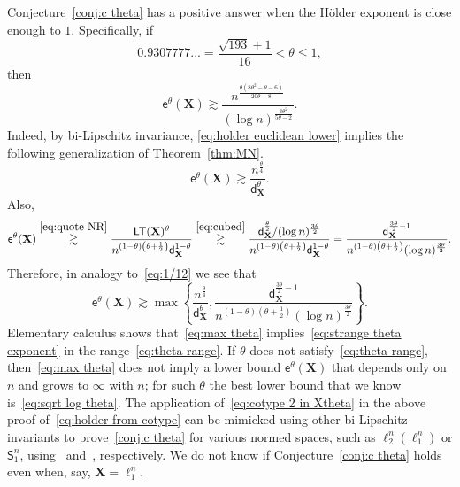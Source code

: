 \documentclass[11pt,reqno]{amsart}
\renewcommand{\le}{\leqslant}
\newcommand{\dd}{\mathsf{d}}
\newcommand{\X}{\mathbf X}
\theoremstyle{remark}
\newcommand{\sfS}{\mathsf{S}}
\newcommand{\ee}{\mathsf{e}}
\renewcommand{\1}{\mathbf 1}
\newcommand{\LT}{\mathsf{LT}}
\begin{document}
Conjecture~\ref{conj:c theta} has a positive answer when the H\"older exponent is close enough to $1$. Specifically, if
\begin{equation}\label{eq:theta range}
0.9307777...=\frac{\sqrt{193}+1}{16}< \theta \le 1,
\end{equation}
then
\begin{equation}\label{eq:strange theta exponent}
\ee^\theta(\X)\gtrsim \frac{ n^{\frac{\theta(8\theta^2-\theta-6)}{20\theta-8}}}{(\log n)^{\frac{3\theta^2}{5\theta-2}}}.
\end{equation}
Indeed, by bi-Lipschitz invariance, \eqref{eq:holder euclidean lower} implies the following generalization of Theorem~\ref{thm:MN}.
$$
\ee^\theta(\X)\gtrsim \frac{n^{\frac{\theta}{4}}}{\dd_\X^\theta}.
$$
Also,
$$
\ee^\theta(\X)\stackrel{\eqref{eq:quote NR}}{\gtrsim} \frac{\LT(\X)^\theta}{n^{(1-\theta)\left(\theta+\frac12\right)}\dd_\X^{1-\theta}}\stackrel{\eqref{eq:cubed}}{\gtrsim}  \frac{\dd_\X^{\frac{\theta}{2}}/(\log n)^{\frac{3\theta}{2}}}{n^{(1-\theta)\left(\theta+\frac12\right)}\dd_\X^{1-\theta}}=\frac{\dd_\X^{\frac{3\theta}{2}-1}}
{n^{(1-\theta)\left(\theta+\frac12\right)}(\log n)^{\frac{3\theta}{2}}}.
$$
Therefore, in analogy to~\eqref{eq:1/12} we see that
\begin{equation}\label{eq:max theta}
\ee^\theta(\X)\gtrsim \max\left\{\frac{n^{\frac{\theta}{4}}}{\dd_\X^\theta},\frac{\dd_\X^{\frac{3\theta}{2}-1}}
{n^{(1-\theta)\left(\theta+\frac12\right)}(\log n)^{\frac{3\theta}{2}}}\right\}.
\end{equation}
Elementary calculus shows that~\eqref{eq:max theta} implies~\eqref{eq:strange theta exponent} in the range~\eqref{eq:theta range}. If $\theta$ does not satisfy~\eqref{eq:theta range}, then~\eqref{eq:max theta} does not imply a lower bound $\ee^\theta(\X)$ that depends only on $n$ and grows to $\infty$ with $n$; for such $\theta$ the best lower bound that we know  is~\eqref{eq:sqrt log theta}. The application of~\eqref{eq:cotype 2 in Xtheta} in the above proof of~\eqref{eq:holder from cotype} can be mimicked  using other bi-Lipschitz invariants to prove~\eqref{conj:c theta} for various normed spaces, such as $\ell_2^n(\ell_1^n)$ or $\sfS_1^n$, using~\cite{NS16} and~\cite{NS21}, respectively. We do not know if Conjecture~\ref{conj:c theta} holds even when, say, $\X=\ell_1^n$.
\end{document}
